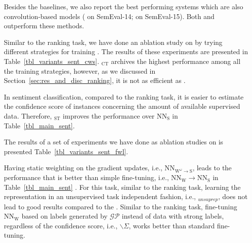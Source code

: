 Besides the baselines, we also report the best performing systems which are also convolution-based models (\citealt{Rouvier:2016} on SemEval-14; \citealt{Deriu2016:SemEval} on SemEval-15). Both \cws and \fwl outperform these methods.



Similar to the ranking task, we have done an ablation study on \cws by trying different strategies for training \cws. The results of these experiments are presented in Table~\ref{tbl_variants_sent_cws}. \cws$_\text{CT}$ archives the highest performance among all the training strategies, however, as we discussed in Section~\ref{sec:res_and_disc_ranking}, it is not as efficient as \cws. 

In sentiment classification, compared to the ranking task, it is easier to estimate the confidence score of instances concerning the amount of available supervised data. Therefore, \cws$_\text{ST}$ improves the performance over $\text{NN}_{\text{S}}$ in Table~\ref{tbl_main_sent}. 



The results of a set of experiments we have done as ablation studies on \fwl is presented Table~\ref{tbl_variants_sent_fwl}. 

Having static weighting on the gradient updates, i.e., NN$_{\text{W}^\omega \to \text{S}}$, leads to the performance that is better than simple fine-tuning, i.e., $\text{NN}_{\text{W}} \to \text{NN}_{\text{S}}$ in Table~\ref{tbl_main_sent} .
%
For this task, similar to the ranking task, learning the representation in an unsupervised task independent fashion, i.e., \fwlnospace$_{unsuprep}$, does not lead to good results compared to the \fwl.
%
Similar to the ranking task, fine-tuning $\text{NN}_{\text{W}}$ based on labels generated by $\mathcal{GP}$ instead of data with strong labels, regardless of the confidence score, i.e., \fwl$\backslash\Sigma$, works better than standard fine-tuning. 